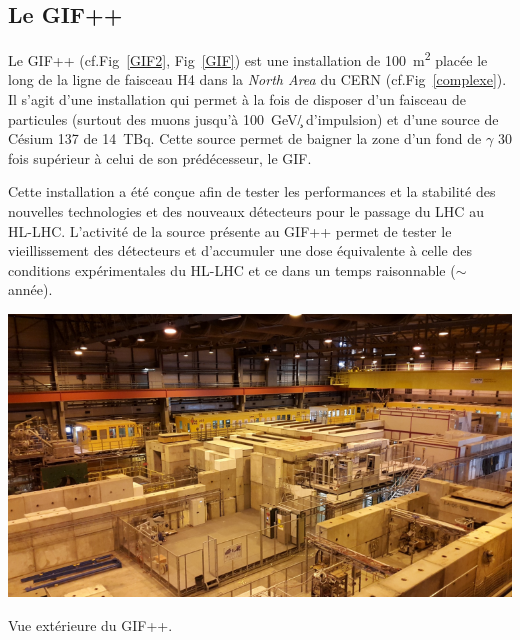 \subsection{Le GIF++}
Le GIF++ \cite{Jakel:1977147} (cf.Fig~\ref{GIF2}, Fig~\ref{GIF}) est une installation de \SI{100}{\square\meter} placée le long de la ligne de faisceau H4 dans la \textit{North Area} du CERN (cf.Fig~\ref{complexe}). Il s'agit d'une installation qui permet à la fois de disposer d'un faisceau de particules (surtout des muons jusqu'à \SI{100}{\giga\eV/\c} d'impulsion) et d'une source de Césium \num{137} de \SI{14}{\tera\becquerel}. Cette source permet de baigner la zone d'un fond de $\gamma$ \num{30} fois supérieur à celui de son prédécesseur, le GIF.

Cette installation a été conçue afin de tester les performances et la stabilité des nouvelles technologies et des nouveaux détecteurs pour le passage du LHC au HL-LHC. L'activité de la source présente au GIF++ permet de tester le vieillissement des détecteurs et d'accumuler une dose équivalente à celle des conditions expérimentales du HL-LHC et ce dans un temps raisonnable ($\sim$ année). 

\marginpar
{
	\centering
	\includegraphics[width=\marginparwidth]{GLA/GIF2.png}
	\captionsetup{type=figure}\caption{Vue extérieure du GIF++.}
	\label{GIF2}
}

